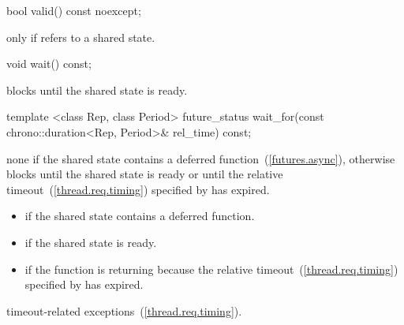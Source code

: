 %
%
\begin{itemdecl}
bool valid() const noexcept;
\end{itemdecl}

\begin{itemdescr}
\pnum
\returns {} only if  refers to a shared state.
\end{itemdescr}

%
%
\begin{itemdecl}
void wait() const;
\end{itemdecl}

\begin{itemdescr}
\pnum
\effects
blocks until the shared state is ready.
\end{itemdescr}

%
%
\begin{itemdecl}
template <class Rep, class Period>
  future_status wait_for(const chrono::duration<Rep, Period>& rel_time) const;
\end{itemdecl}

\begin{itemdescr}
\pnum
\effects
none if the shared state contains a deferred function~(\ref{futures.async}),
otherwise
blocks until the shared state is ready or until
the relative timeout~(\ref{thread.req.timing}) specified by
 has expired.

\pnum
\returns

\begin{itemize}
\item {} if the shared state contains a deferred
function.

\item {} if the shared state is ready.

\item {} if the function is returning because the
relative timeout~(\ref{thread.req.timing})
specified by  has expired.
\end{itemize}

\pnum
\throws
timeout-related exceptions~(\ref{thread.req.timing}).
\end{itemdescr}


